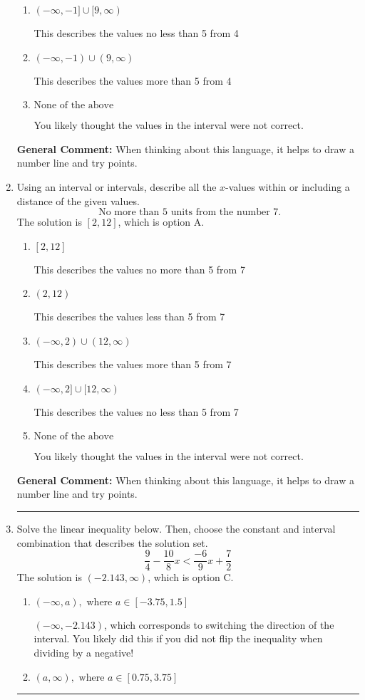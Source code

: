 \documentclass{extbook}[14pt]
\newcommand{\litem}[1]{\item #1

\rule{\textwidth}{0.4pt}}
\begin{document}
\begin{enumerate}
{\begin{enumerate}[label=\Alph*.]
This describes the values no more than 5 from 4
\item \( (-\infty, -1] \cup [9, \infty) \)

This describes the values no less than 5 from 4
\item \( (-\infty, -1) \cup (9, \infty) \)

This describes the values more than 5 from 4
\item \( \text{None of the above} \)

You likely thought the values in the interval were not correct.
\end{enumerate}

\textbf{General Comment:} When thinking about this language, it helps to draw a number line and try points.
}
\litem{
Using an interval or intervals, describe all the $x$-values within or including a distance of the given values.
\[ \text{ No more than } 5 \text{ units from the number } 7. \]The solution is \( [2, 12] \), which is option A.\begin{enumerate}[label=\Alph*.]
\item \( [2, 12] \)

This describes the values no more than 5 from 7
\item \( (2, 12) \)

This describes the values less than 5 from 7
\item \( (-\infty, 2) \cup (12, \infty) \)

This describes the values more than 5 from 7
\item \( (-\infty, 2] \cup [12, \infty) \)

This describes the values no less than 5 from 7
\item \( \text{None of the above} \)

You likely thought the values in the interval were not correct.
\end{enumerate}

\textbf{General Comment:} When thinking about this language, it helps to draw a number line and try points.
}
\litem{
Solve the linear inequality below. Then, choose the constant and interval combination that describes the solution set.
\[ \frac{9}{4} - \frac{10}{8} x < \frac{-6}{9} x + \frac{7}{2} \]The solution is \( (-2.143, \infty) \), which is option C.\begin{enumerate}[label=\Alph*.]
\item \( (-\infty, a), \text{ where } a \in [-3.75, 1.5] \)

 $(-\infty, -2.143)$, which corresponds to switching the direction of the interval. You likely did this if you did not flip the inequality when dividing by a negative!
\item \( (a, \infty), \text{ where } a \in [0.75, 3.75] \)


\end{enumerate}}
\end{enumerate}
\end{document}
